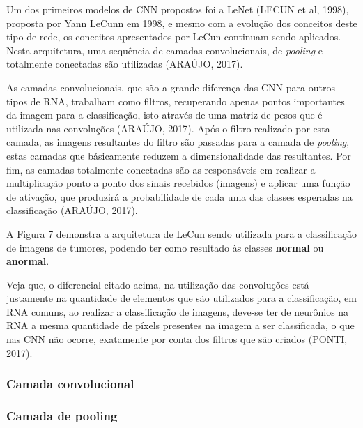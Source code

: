 Um dos primeiros modelos de CNN propostos foi a LeNet (LECUN et al, 1998), proposta por Yann LeCunn em 1998, e mesmo com a evolução dos conceitos deste tipo de rede, os conceitos apresentados por LeCun continuam sendo aplicados. Nesta arquitetura, uma sequência de camadas convolucionais, de \textit{pooling} e totalmente conectadas são utilizadas (ARAÚJO, 2017).

As camadas convolucionais, que são a grande diferença das CNN para outros tipos de RNA, trabalham como filtros, recuperando apenas pontos importantes da imagem para a classificação, isto através de uma matriz de pesos que é utilizada nas convoluções (ARAÚJO, 2017). Após o filtro realizado por esta camada, as imagens resultantes do filtro são passadas para a camada de \textit{pooling}, estas camadas que básicamente reduzem a dimensionalidade das resultantes. Por fim, as camadas totalmente conectadas são as responsáveis em realizar a multiplicação ponto a ponto dos sinais recebidos (imagens) e aplicar uma função de ativação, que produzirá a probabilidade de cada uma das classes esperadas na classificação (ARAÚJO, 2017).

A Figura 7 demonstra a arquitetura de LeCun sendo utilizada para a classificação de imagens de tumores, podendo ter como resultado às classes \textbf{normal} ou \textbf{anormal}.


Veja que, o diferencial citado acima, na utilização das convoluções está justamente na quantidade de elementos que são utilizados para a classificação, em RNA comuns, ao realizar a classificação de imagens, deve-se ter de neurônios na RNA a mesma quantidade de píxels presentes na imagem a ser classificada, o que nas CNN não ocorre, exatamente por conta dos filtros que são criados (PONTI, 2017). 

\subsubsection{Camada convolucional}

\subsubsection{Camada de pooling}


